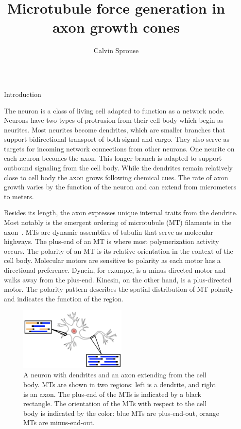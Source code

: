\documentclass{beamer}
\title{Microtubule force generation in axon growth cones}
\author{Calvin Sprouse}
\institute[CWU]{Department of Physics, Central Washington University}
\newlength{\sepwidth}
\newlength{\colwidth}
\newcommand{\separatorcolumn}{\begin{column}{\sepwidth}\end{column}}
\begin{document}
\begin{frame}[t]
\begin{columns}[t]
\separatorcolumn%


\begin{column}{\colwidth}

\begin{block}{Introduction}

The neuron is a class of living cell adapted to function as a network node. Neurons have two types of protrusion from their cell body which begin as neurites. Most neurites become dendrites, which are smaller branches that support bidirectional transport of both signal and cargo. They also serve as targets for incoming network connections from other neurons. One neurite on each neuron becomes the axon. This longer branch is adapted to support outbound signaling from the cell body. While the dendrites remain relatively close to cell body the axon grows following chemical cues. The rate of axon growth varies by the function of the neuron and can extend from micrometers to meters.

Besides its length, the axon expresses unique internal traits from the dendrite. Most notably is the emergent ordering of microtubule (MT) filaments in the axon~\cite{nedelec_self-organization_1997}. MTs are dynamic assemblies of tubulin that serve as molecular highways. The plus-end of an MT is where most polymerization activity occurs. The polarity of an MT is its relative orientation in the context of the cell body. Molecular motors are sensitive to polarity as each motor has a directional preference. Dynein, for example, is a minus-directed motor and walks away from the plus-end. Kinesin, on the other hand, is a plus-directed motor. The polarity pattern describes the spatial distribution of MT polarity and indicates the function of the region.

\begin{figure}
    \centering
    \includegraphics[width=0.5\textwidth]{figures/background/neuron_with_mts.png}
    \caption{\label{fig:neuron_background}
        A neuron with dendrites and an axon extending from the cell body. MTs are shown in two regions: left is a dendrite, and right is an axon. The plus-end of the MTs is indicated by a black rectangle. The orientation of the MTs with respect to the cell body is indicated by the color: blue MTs are plus-end-out, orange MTs are minus-end-out.}
\end{figure}


\end{block}
\end{column}
\end{columns}
\end{frame}
\end{document}
